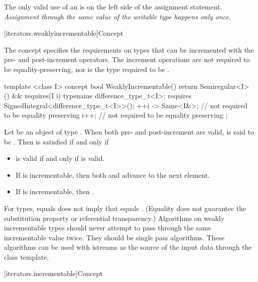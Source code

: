 \pnum
\enternote
The only valid use of an  is on the left side of the assignment statement.
\textit{Assignment through the same value of the writable type happens only once.}
\exitnote

[iterators.weaklyincrementable]{Concept }

\pnum
The  concept specifies the requirements on
types that can be incremented with the pre- and post-increment operators.
The increment operations are not required to be equality-preserving,
nor is the type required to be .

%
\begin{codeblock}
  template <class I>
  concept bool WeaklyIncrementable() {
    return Semiregular<I>() &&
      requires(I i) {
        typename difference_type_t<I>;
        requires SignedIntegral<difference_type_t<I>>();
        { ++i } -> Same<I&>; // not required to be equality preserving
        i++; // not required to be equality preserving
      };
  }
\end{codeblock}

\pnum
Let  be an object of type . When both pre- and post-increment
are valid,  is said to be . Then
 is satisfied if and only if

\begin{itemize}
\item {} is valid if and only if  is valid.
\item If  is incrementable, then both 
  and  advance  to the next element.
\item If  is incrementable, then .
\end{itemize}

\pnum
\enternote For  types,  equals  does not imply that 
equals . (Equality does not guarantee the substitution property or referential
transparency.) Algorithms on weakly incrementable types should never attempt to pass
through the same incrementable value twice. They should be single pass algorithms. These algorithms
can be used with istreams as the source of the input data through the  class
template.\exitnote

[iterators.incrementable]{Concept }

